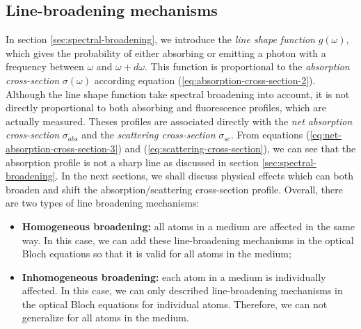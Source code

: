 {%
\subsection{Line-broadening mechanisms}
\label{sec:line-broadening-mechanisms}

In section \ref{sec:spectral-broadening}, we introduce the \textit{line shape function} $ g(\omega) $, which gives the probability of either absorbing or emitting a photon with a frequency between $ \omega $ and $ \omega + d\omega $. This function is proportional to the \textit{absorption cross-section} $ \sigma(\omega) $ according equation (\ref{eq:absorption-cross-section-2}). Although the line shape function take spectral broadening into account, it is not directly proportional to both absorbing and fluorescence profiles, which are actually measured. Theses profiles are associated directly with the \textit{net absorption cross-section} $ \sigma_{abs} $ and the \textit{scattering cross-section} $ \sigma_{sc} $. From equations (\ref{eq:net-absorption-cross-section-3}) and (\ref{eq:scattering-cross-section}), we can see that the absorption profile is not a sharp line as discussed in section \ref{sec:spectral-broadening}. In the next sections, we shall discuss physical effects which can both broaden and shift the absorption/scattering cross-section profile. Overall, there are two types of line broadening mechanisms:
\begin{itemize}
	\item \textbf{Homogeneous broadening:} all atoms in a medium are affected in the same way. In this case, we can add these line-broadening mechanisms in the optical Bloch equations so that it is valid for all atoms in the medium;

	\item \textbf{Inhomogeneous broadening:} each atom in a medium is individually affected. In this case, we can only described line-broadening mechanisms in the optical Bloch equations for individual atoms. Therefore, we can not generalize for all atoms in the medium.
\end{itemize}

}
